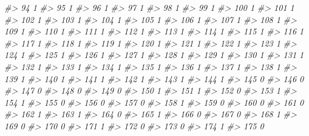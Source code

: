 \documentclass[]{book}
\newenvironment{Shaded}{\begin{snugshade}}{\end{snugshade}}
\newcommand{\CommentTok}[1]{\textcolor[rgb]{0.56,0.35,0.01}{\textit{#1}}}
\begin{document}
\begin{Shaded}
\begin{Highlighting}[]
\CommentTok{#> 94            1}
\CommentTok{#> 95            1}
\CommentTok{#> 96            1}
\CommentTok{#> 97            1}
\CommentTok{#> 98            1}
\CommentTok{#> 99            1}
\CommentTok{#> 100           1}
\CommentTok{#> 101           1}
\CommentTok{#> 102           1}
\CommentTok{#> 103           1}
\CommentTok{#> 104           1}
\CommentTok{#> 105           1}
\CommentTok{#> 106           1}
\CommentTok{#> 107           1}
\CommentTok{#> 108           1}
\CommentTok{#> 109           1}
\CommentTok{#> 110           1}
\CommentTok{#> 111           1}
\CommentTok{#> 112           1}
\CommentTok{#> 113           1}
\CommentTok{#> 114           1}
\CommentTok{#> 115           1}
\CommentTok{#> 116           1}
\CommentTok{#> 117           1}
\CommentTok{#> 118           1}
\CommentTok{#> 119           1}
\CommentTok{#> 120           1}
\CommentTok{#> 121           1}
\CommentTok{#> 122           1}
\CommentTok{#> 123           1}
\CommentTok{#> 124           1}
\CommentTok{#> 125           1}
\CommentTok{#> 126           1}
\CommentTok{#> 127           1}
\CommentTok{#> 128           1}
\CommentTok{#> 129           1}
\CommentTok{#> 130           1}
\CommentTok{#> 131           1}
\CommentTok{#> 132           1}
\CommentTok{#> 133           1}
\CommentTok{#> 134           1}
\CommentTok{#> 135           1}
\CommentTok{#> 136           1}
\CommentTok{#> 137           1}
\CommentTok{#> 138           1}
\CommentTok{#> 139           1}
\CommentTok{#> 140           1}
\CommentTok{#> 141           1}
\CommentTok{#> 142           1}
\CommentTok{#> 143           1}
\CommentTok{#> 144           1}
\CommentTok{#> 145           0}
\CommentTok{#> 146           0}
\CommentTok{#> 147           0}
\CommentTok{#> 148           0}
\CommentTok{#> 149           0}
\CommentTok{#> 150           1}
\CommentTok{#> 151           1}
\CommentTok{#> 152           0}
\CommentTok{#> 153           1}
\CommentTok{#> 154           1}
\CommentTok{#> 155           0}
\CommentTok{#> 156           0}
\CommentTok{#> 157           0}
\CommentTok{#> 158           1}
\CommentTok{#> 159           0}
\CommentTok{#> 160           0}
\CommentTok{#> 161           0}
\CommentTok{#> 162           1}
\CommentTok{#> 163           1}
\CommentTok{#> 164           0}
\CommentTok{#> 165           1}
\CommentTok{#> 166           0}
\CommentTok{#> 167           0}
\CommentTok{#> 168           1}
\CommentTok{#> 169           0}
\CommentTok{#> 170           0}
\CommentTok{#> 171           1}
\CommentTok{#> 172           0}
\CommentTok{#> 173           0}
\CommentTok{#> 174           1}
\CommentTok{#> 175           0}

\end{Highlighting}
\end{Shaded}
\end{document}
